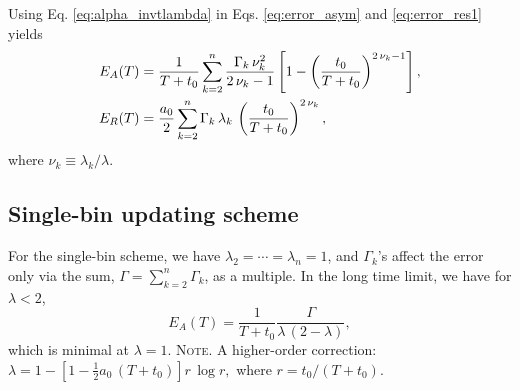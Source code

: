 \documentclass[reprint, superscriptaddress, floatfix]{revtex4-1}
\newcommand{\note}[1]{{\color{DarkGreen}\footnotesize \textsc{Note.} #1}}
\newcommand{\Err}{E}
\begin{document}
Using Eq. \eqref{eq:alpha_invtlambda}
in Eqs. \eqref{eq:error_asym}
and \eqref{eq:error_res1}
yields
%
\begin{align}
  \Err_A(T)
  &=
  \frac{    1    }
       { T + t_0 }
  \sum_{k = 2}^n
    \frac{ \Gamma_k \, \nu_k^2 }
         {    2 \, \nu_k - 1   }
  \left[
    1 - \left(
          \frac {     t_0 }
                { T + t_0 }
        \right)^{ 2 \, \nu_k - 1 }
  \right]
  ,
  \notag
  \\
  \Err_R(T)
  &=
  \frac { a_0 } { 2 }
  \sum_{k = 2}^n
  \Gamma_k \, \lambda_k \,
  \left(
      \frac{   t_0   }
           { T + t_0 }
  \right)^{ 2 \, \nu_k }
  ,
  \notag
\end{align}
%
where $\nu_k \equiv \lambda_k / \lambda$.
%
%
%




\subsection{\label{sec:invt_singlebin}
  Single-bin updating scheme
}



For the single-bin scheme, we have
$\lambda_2 = \cdots = \lambda_n = 1$,
and
$\Gamma_k$'s affect the error
only via the sum, $\Gamma = \sum_{k = 2}^n \Gamma_k$,
as a multiple.
%
In the long time limit,
we have for $\lambda < 2$,
$$
  \Err_A(T)
  =
  \frac { 1 } { T + t_0 }
  \frac {         \Gamma           }
        { \lambda \, (2 - \lambda) }
  ,
$$
which is minimal at $\lambda = 1$.
%
\note{A higher-order correction:
  $
  \lambda = 1 -
  \left[
    1 - \frac 1 2 a_0 \, (T+t_0)
  \right] r \, \log r
  ,
  $
  where $r = t_0 / (T + t_0)$.
}
\end{document}
